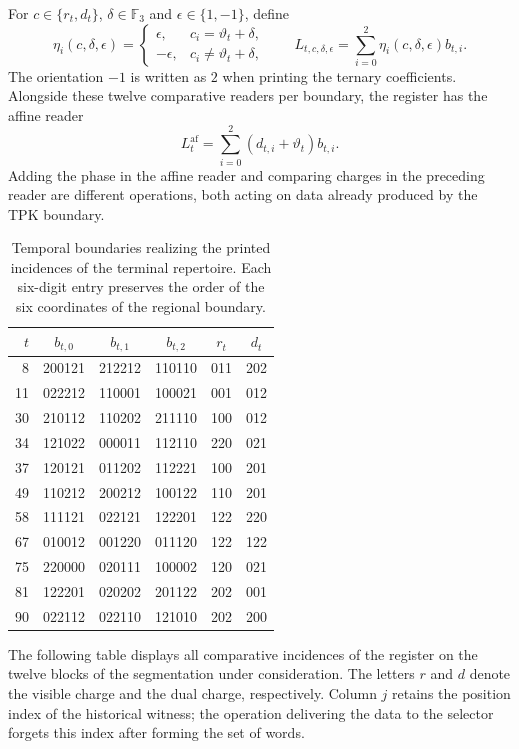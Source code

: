 For $c\in\{r_t,d_t\}$, $\delta\in\mathbb F_3$ and
$\epsilon\in\{1,-1\}$, define
\[
 \eta_i(c,\delta,\epsilon)=
 \begin{cases}
  \epsilon,&c_i=\vartheta_t+\delta,\\
  -\epsilon,&c_i\ne\vartheta_t+\delta,
 \end{cases}
 \qquad
 L_{t,c,\delta,\epsilon}
   =\sum_{i=0}^{2}\eta_i(c,\delta,\epsilon)b_{t,i}.
\]
The orientation $-1$ is written as $2$ when printing the ternary
coefficients. Alongside these twelve comparative readers per boundary, the
register has the affine reader
\[
 L^{\mathrm{af}}_t
    =\sum_{i=0}^{2}(d_{t,i}+\vartheta_t)b_{t,i}.
\]
Adding the phase in the affine reader and comparing charges in
the preceding reader are different operations, both acting on data already
produced by the TPK boundary.

\begin{table}[htbp]
\centering\small
\begin{tabular}{rccc cc}
\toprule
$t$&$b_{t,0}$&$b_{t,1}$&$b_{t,2}$&$r_t$&$d_t$\\
\midrule
8 &200121&212212&110110&011&202\\
11&022212&110001&100021&001&012\\
30&210112&110202&211110&100&012\\
34&121022&000011&112110&220&021\\
37&120121&011202&112221&100&201\\
49&110212&200212&100122&110&201\\
58&111121&022121&122201&122&220\\
67&010012&001220&011120&122&122\\
75&220000&020111&100002&120&021\\
81&122201&020202&201122&202&001\\
90&022112&022110&121010&202&200\\
\bottomrule
\end{tabular}
\caption{Temporal boundaries realizing the printed incidences of the
terminal repertoire. Each six-digit entry preserves the order of
the six coordinates of the regional boundary.}
\label{tab:terminal-bandas-testigo}
\end{table}

The following table displays all comparative incidences of the
register on the twelve blocks of the segmentation under consideration. The
letters $r$ and $d$ denote the visible charge and the dual charge,
respectively. Column $j$ retains the position index of the historical witness;
the operation delivering the data to the selector forgets this index after forming
the set of words.

